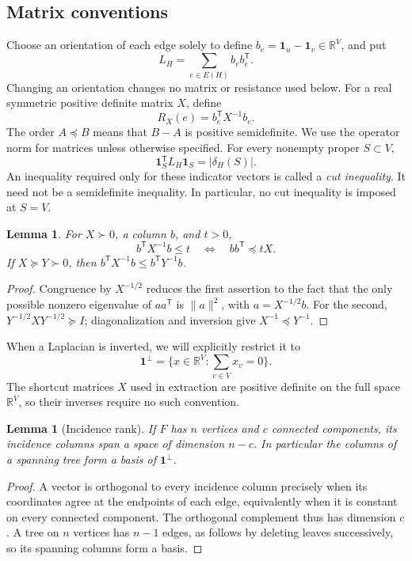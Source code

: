 \documentclass[11pt]{amsart}
\newcommand{\R}{\mathbb R}
\newtheorem{lemma}[theorem]{Lemma}
\theoremstyle{definition}
\theoremstyle{remark}
\numberwithin{equation}{section}
\begin{document}
\subsection{Matrix conventions}

Choose an orientation of each edge solely to define
\(b_e=\mathbf1_u-\mathbf1_v\in\R^V\), and put
\[
 L_H=\sum_{e\in E(H)}b_eb_e^{\mathsf T}.
\]
Changing an orientation changes no matrix or resistance used below.
For a real symmetric positive definite matrix \(X\), define
\[
 R_X(e)=b_e^{\mathsf T}X^{-1}b_e.
\]
The order \(A\preceq B\) means that \(B-A\) is positive semidefinite.
We use the operator norm for matrices unless otherwise specified.
For every nonempty proper \(S\subset V\),
\[
 \mathbf1_S^{\mathsf T}L_H\mathbf1_S=|\delta_H(S)|.
\]
An inequality required only for these indicator vectors is called a
\emph{cut inequality}. It need not be a semidefinite inequality.
In particular, no cut inequality is imposed at \(S=V\).

\begin{lemma}\label{lem:resistance-order}
For \(X\succ0\), a column \(b\), and \(t>0\),
\[
 b^{\mathsf T}X^{-1}b\le t
 \quad\Longleftrightarrow\quad
 bb^{\mathsf T}\preceq tX.
\]
If \(X\succeq Y\succ0\), then
\(b^{\mathsf T}X^{-1}b\le b^{\mathsf T}Y^{-1}b\).
\end{lemma}
\begin{proof}
Congruence by \(X^{-1/2}\) reduces the first assertion to the fact
that the only possible nonzero eigenvalue of \(aa^{\mathsf T}\) is
\(\|a\|^2\), with \(a=X^{-1/2}b\).
For the second, \(Y^{-1/2}XY^{-1/2}\succeq I\); diagonalization and
inversion give \(X^{-1}\preceq Y^{-1}\).
\end{proof}

When a Laplacian is inverted, we will explicitly restrict it to
\[
 \mathbf1^\perp=\{x\in\R^V:\textstyle\sum_{v\in V}x_v=0\}.
\]
The shortcut matrices \(X\) used in extraction are positive definite
on the full space \(\R^V\), so their inverses require no such convention.

\begin{lemma}[Incidence rank]\label{lem:incidence-rank}
If \(F\) has \(n\) vertices and \(c\) connected components, its
incidence columns span a space of dimension \(n-c\).
In particular the columns of a spanning tree form a basis of
\(\mathbf1^\perp\).
\end{lemma}
\begin{proof}
A vector is orthogonal to every incidence column precisely when
its coordinates agree at the endpoints of each edge, equivalently
when it is constant on every connected component.
The orthogonal complement thus has dimension \(c\).
A tree on \(n\) vertices has \(n-1\) edges, as follows by deleting
leaves successively, so its spanning columns form a basis.
\end{proof}
\end{document}
